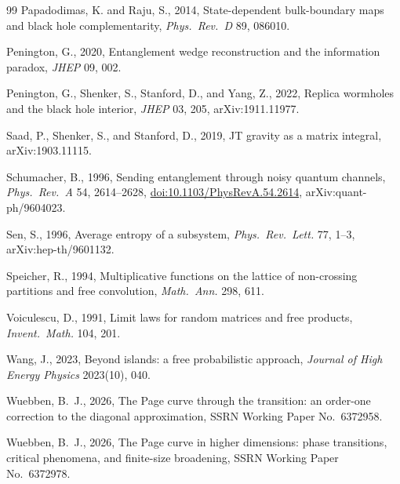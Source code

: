 \documentclass[11pt,letterpaper]{article}
\theoremstyle{plain}
\theoremstyle{definition}
\theoremstyle{remark}
\begin{document}
\begin{thebibliography}{99}
Papadodimas, K. and Raju, S., 2014, State-dependent bulk-boundary maps and black hole complementarity, \textit{Phys.\ Rev.\ D} 89, 086010.

Penington, G., 2020, Entanglement wedge reconstruction and the information paradox, \textit{JHEP} 09, 002.

Penington, G., Shenker, S., Stanford, D., and Yang, Z., 2022, Replica wormholes and the black hole interior, \textit{JHEP} 03, 205, arXiv:1911.11977.

Saad, P., Shenker, S., and Stanford, D., 2019, JT gravity as a matrix integral, arXiv:1903.11115.

Schumacher, B., 1996, Sending entanglement through noisy quantum channels,
\textit{Phys.\ Rev.\ A} 54, 2614--2628,
\href{https://doi.org/10.1103/PhysRevA.54.2614}{doi:10.1103/PhysRevA.54.2614},
arXiv:quant-ph/9604023.

Sen, S., 1996, Average entropy of a subsystem,
\textit{Phys.\ Rev.\ Lett.} 77, 1--3, arXiv:hep-th/9601132.

Speicher, R., 1994, Multiplicative functions on the lattice of non-crossing partitions and free convolution, \textit{Math.\ Ann.} 298, 611.

Voiculescu, D., 1991, Limit laws for random matrices and free products, \textit{Invent.\ Math.} 104, 201.

Wang, J., 2023, Beyond islands: a free probabilistic approach, \textit{Journal of High Energy Physics} 2023(10), 040.

Wuebben, B.~J., 2026, The Page curve through the transition: an order-one correction to the diagonal approximation, SSRN Working Paper No.\ 6372958.

Wuebben, B.~J., 2026, The Page curve in higher dimensions: phase transitions, critical phenomena, and finite-size broadening, SSRN Working Paper No.\ 6372978.

\end{thebibliography}
\end{document}
